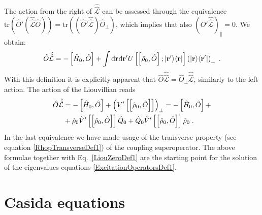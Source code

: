 \documentclass[reprint,aps,prb]{revtex4-1}
\newcommand{\dd}{{\rm d}}
\renewcommand{\r}{{\bf r}}
\newcommand{\be}{\begin{equation}}
\newcommand{\ee}{\end{equation}}
\newcommand{\nn}{\notag}
\newcommand{\lb}{\label}
\newcommand{\op}[1]{\hat {#1}}
\newcommand{\sop}[1]{\op{\op {#1}}}
\newcommand{\commutator}[2]{\left[ {#1} , {#2} \right]}
\newcommand{\trace}[1]{\mathrm{tr}\left(#1\right)}
\newcommand{\ketbra}[2]{| #1 \rangle \langle #2 |}
\newcommand{\dmnot}{\op{\rho}_0}
\newcommand{\hnot}{\op{H}_0}
\newcommand{\Liouv}{\sop{\mathcal L}}
\begin{document}
The action from the right of $\Liouv$ can be assessed through the equivalence $\trace{\op O'(\Liouv\op O)} = \trace{(\op O'\Liouv)\op O_\perp}$, which implies that also
$\left(\op O' \Liouv\right)_\parallel =0$. We obtain:
\be
\op O\Liouv = -\commutator{\hnot}{\op O} + \int \dd\r\dd\r'
U\left[\commutator{\dmnot}{\op O};\ketbra{\r'}{\r}\right]\left(\ketbra{\r}{\r'}\right)_\perp \;. \nn
\ee
With this definition it is explicitly apparent that $\op O\Liouv=\op O_\perp \Liouv$,
similarly to the left action. The action of the Liouvillian reads
\begin{align}\lb{LiouvillianRightActionDef1}
\op O\Liouv &= -\commutator{\hnot}{\op O} + \left(V'\left[\commutator{{\dmnot}}{\op O}\right]\right)_\perp = -\commutator{\hnot}{\op O} + \nn \\
&+ \dmnot\op V'\left[\commutator{{\dmnot}}{\op O}\right]\op Q_0 + \op Q_0\op V'\left[\commutator{\dmnot}{\op O}\right]\dmnot \;.
\end{align}
In the last equivalence we have made usage of the transverse property (see equation \eqref{RhopTransverseDef1}) of the coupling superoperator. The above formulae
together with Eq.~\eqref{LiouZeroDef1} are the starting point for the solution of the eigenvalues equations \eqref{ExcitationOperatorsDef1}.

\section{Casida equations}
\label{casida}
\end{document}

